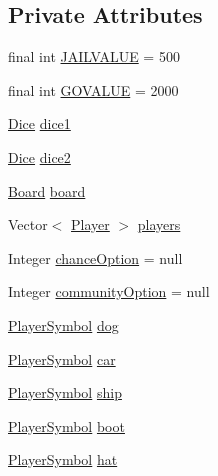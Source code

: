 \subsection*{Private Attributes}
\begin{DoxyCompactItemize}
\item 
final int \hyperlink{class_monopoly_1_1_logic_1_1_game_a0e9301a2ac7d3af022ec8f0846e3f96a}{J\+A\+I\+L\+V\+A\+L\+UE} = 500
\item 
final int \hyperlink{class_monopoly_1_1_logic_1_1_game_a56756d9c96a11f599e4abaed874b2cf9}{G\+O\+V\+A\+L\+UE} = 2000
\item 
\hyperlink{class_monopoly_1_1_logic_1_1_dice}{Dice} \hyperlink{class_monopoly_1_1_logic_1_1_game_ade748d7293525398b9c16959dbb5dd30}{dice1}
\item 
\hyperlink{class_monopoly_1_1_logic_1_1_dice}{Dice} \hyperlink{class_monopoly_1_1_logic_1_1_game_af248656616e885a175559dc3a1131478}{dice2}
\item 
\hyperlink{class_monopoly_1_1_logic_1_1_board}{Board} \hyperlink{class_monopoly_1_1_logic_1_1_game_ac8c4913448cdb3e37b3ac102e9b115d2}{board}
\item 
Vector$<$ \hyperlink{class_monopoly_1_1_logic_1_1_player}{Player} $>$ \hyperlink{class_monopoly_1_1_logic_1_1_game_abc3b3d5d0514ad27889ffd8f80cb58e9}{players}
\item 
Integer \hyperlink{class_monopoly_1_1_logic_1_1_game_a31a86909fac3b9813f640e1bde0dca67}{chance\+Option} = null
\item 
Integer \hyperlink{class_monopoly_1_1_logic_1_1_game_af554ecfbf29629088223f2b39fd30957}{community\+Option} = null
\item 
\hyperlink{class_monopoly_1_1_logic_1_1_player_symbol}{Player\+Symbol} \hyperlink{class_monopoly_1_1_logic_1_1_game_adbdd554348dd81614993d80ac53d98c3}{dog}
\item 
\hyperlink{class_monopoly_1_1_logic_1_1_player_symbol}{Player\+Symbol} \hyperlink{class_monopoly_1_1_logic_1_1_game_a057c4d7914dd124f288fc308c8ba33c2}{car}
\item 
\hyperlink{class_monopoly_1_1_logic_1_1_player_symbol}{Player\+Symbol} \hyperlink{class_monopoly_1_1_logic_1_1_game_aa3284241255ce061e89c840372e9ace0}{ship}
\item 
\hyperlink{class_monopoly_1_1_logic_1_1_player_symbol}{Player\+Symbol} \hyperlink{class_monopoly_1_1_logic_1_1_game_a16abdb90decd1f01e20ad2704ce7f8a2}{boot}
\item 
\hyperlink{class_monopoly_1_1_logic_1_1_player_symbol}{Player\+Symbol} \hyperlink{class_monopoly_1_1_logic_1_1_game_accef44739797faa0c1acf5e916929fa7}{hat}

\end{DoxyCompactItemize}
